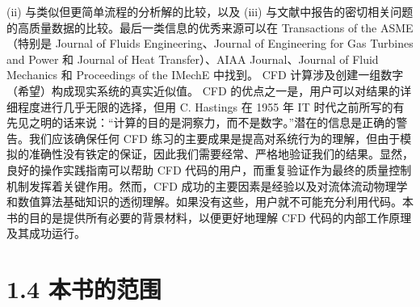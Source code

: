 \documentclass[11pt,a4paper,openany,fontset=none]{ctexbook}
\begin{document}
(ii) 与类似但更简单流程的分析解的比较，以及 (iii) 与文献中报告的密切相关问题的高质量数据的比较。最后一类信息的优秀来源可以在 Transactions of the ASME（特别是 Journal of Fluids Engineering、Journal of Engineering for Gas Turbines and Power 和 Journal of Heat Transfer）、AIAA Journal、Journal of Fluid Mechanics 和 Proceedings of the IMechE 中找到。 CFD 计算涉及创建一组数字（希望）构成现实系统的真实近似值。 CFD 的优点之一是，用户可以对结果的详细程度进行几乎无限的选择，但用 C. Hastings 在 1955 年 IT 时代之前所写的有先见之明的话来说：“计算的目的是洞察力，而不是数字。”潜在的信息是正确的警告。我们应该确保任何 CFD 练习的主要成果是提高对系统行为的理解，但由于模拟的准确性没有铁定的保证，因此我们需要经常、严格地验证我们的结果。显然，良好的操作实践指南可以帮助 CFD 代码的用户，而重复验证作为最终的质量控制机制发挥着关键作用。然而，CFD 成功的主要因素是经验以及对流体流动物理学和数值算法基础知识的透彻理解。如果没有这些，用户就不可能充分利用代码。本书的目的是提供所有必要的背景材料，以便更好地理解 CFD 代码的内部工作原理及其成功运行。

\section*{1.4 本书的范围}
\end{document}
